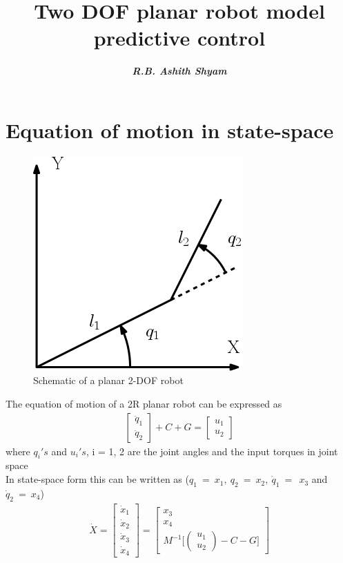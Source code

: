 \documentclass[french]{article}
\title{ \textbf{Two DOF planar robot model predictive control }  }
\author{\textit{\textbf{R.B. Ashith Shyam}}}
\date{}
\begin{document}
	\maketitle
\section{Equation of motion in state-space}

\begin{figure}[h]
	\centering
	\includegraphics[width=0.3\linewidth, height=0.15\textheight]{2r_schematic}
	\caption{Schematic of a planar 2-DOF robot}
	\label{fig:2rschematic}
\end{figure}


	
	The equation of motion of a 2R planar robot can be expressed as 
	\begin{align}
	[M]\begin{bmatrix}
	\ddot{q}_1 \\ 
	\ddot{q}_2
	\end{bmatrix} + C + G = \begin{bmatrix}
	u_1 \\ 
	u_2
	\end{bmatrix}
	\end{align}
	where $q_i's$ and $ u_i's$, i = 1, 2 are the joint angles and the input torques in joint space \\
	In state-space form this can be written as ($q_1 ~= ~x_1,~ q_2 ~= ~x_2,~ \dot{q}_1 ~=~ ~x_3$ and $\dot{q}_2~ = ~x_4$)	
	\begin{align}
	\dot{X} = \begin{bmatrix}
	\dot{x}_1 \\ 
	\dot{x}_2 \\ 
	\dot{x}_3 \\ 
	\dot{x}_4
	\end{bmatrix} = \begin{bmatrix}
	x_3 \\ 
	x_4 \\ 
	M^{-1}\Big[\begin{pmatrix}
	u_1 \\ 
	u_2
	\end{pmatrix} - C - G\Big]
	\end{bmatrix} 
			\label{eq:feedback_linearization}
	\end{align}
\end{document}
